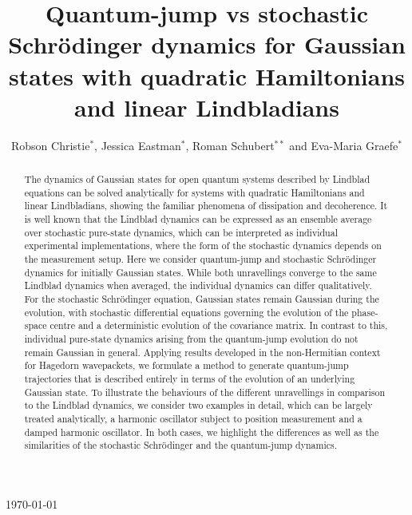 \documentclass[12pt]{iopart} %
\begin{document}
\title[Quantum-jump vs stochastic Schr\"odinger dynamics]{Quantum-jump vs stochastic Schr\"odinger dynamics for Gaussian states with quadratic Hamiltonians and linear Lindbladians}
\author{Robson Christie$^*$, Jessica Eastman$^*$, Roman Schubert$^{**}$ and Eva-Maria Graefe$^*$}
\address{$^*$Department of Mathematics, Imperial College London, London SW7 2AZ,
United Kingdom}
\address{$^{**}$School of Mathematics, University of Bristol, Bristol, BS8 1TW, United Kingdom}
\vspace{10pt}
\begin{indented}
\item[]\today
\end{indented}

\begin{abstract}
The dynamics of Gaussian states for open quantum systems described by Lindblad equations can be solved analytically for systems with quadratic Hamiltonians and linear Lindbladians, showing the familiar phenomena of dissipation and decoherence. It is well known that the Lindblad dynamics can be expressed as an ensemble average over stochastic pure-state dynamics, which can be interpreted as individual experimental implementations, where the form of the stochastic dynamics depends on the measurement setup. Here we consider quantum-jump and stochastic Schr\"odinger dynamics for initially Gaussian states. While both unravellings converge to the same Lindblad dynamics when averaged, the individual dynamics can differ qualitatively. For the stochastic Schr\"odinger equation, Gaussian states remain Gaussian during the evolution, with stochastic differential equations governing the evolution of the phase-space centre and a deterministic evolution of the covariance matrix. In contrast to this, individual pure-state dynamics arising from the quantum-jump evolution do not remain Gaussian in general. Applying results developed in the non-Hermitian context for Hagedorn wavepackets, we formulate a method to generate quantum-jump trajectories that is described entirely in terms of the evolution of an underlying Gaussian state. To illustrate the behaviours of the different unravellings in comparison to the Lindblad dynamics, we consider two examples in detail, which can be largely treated analytically, a harmonic oscillator subject to position measurement and a damped harmonic oscillator. In both cases, we highlight the differences as well as the similarities of the stochastic Schr\"odinger and the quantum-jump dynamics.
\end{abstract}
\end{document}

